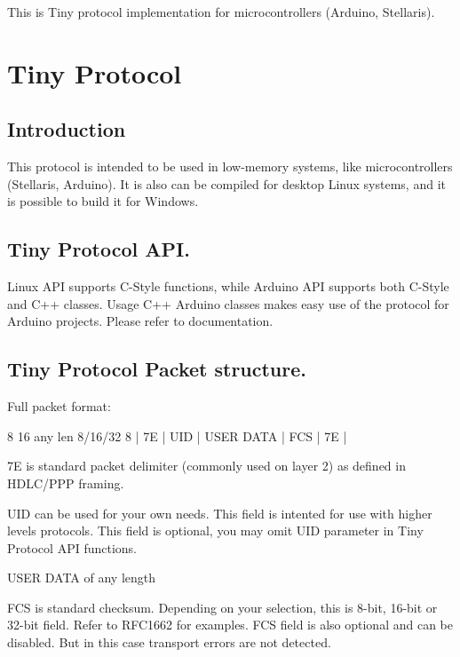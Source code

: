 This is Tiny protocol implementation for microcontrollers (Arduino, Stellaris).

\section*{Tiny Protocol}

\subsection*{Introduction}

This protocol is intended to be used in low-\/memory systems, like microcontrollers (Stellaris, Arduino). It is also can be compiled for desktop Linux systems, and it is possible to build it for Windows.

\subsection*{Tiny Protocol A\+P\+I.}

Linux A\+P\+I supports C-\/\+Style functions, while Arduino A\+P\+I supports both C-\/\+Style and C++ classes. Usage C++ Arduino classes makes easy use of the protocol for Arduino projects. Please refer to documentation.

\subsection*{Tiny Protocol Packet structure.}

Full packet format\+: 
\begin{DoxyPre}
   8    16     any len     8/16/32  8
 | 7E | UID |  USER DATA  |  FCS  | 7E |
\end{DoxyPre}



\begin{DoxyItemize}
\item 7\+E is standard packet delimiter (commonly used on layer 2) as defined in H\+D\+L\+C/\+P\+P\+P framing.
\item U\+I\+D can be used for your own needs. This field is intented for use with higher levels protocols. This field is optional, you may omit U\+I\+D parameter in Tiny Protocol A\+P\+I functions.
\item U\+S\+E\+R D\+A\+T\+A of any length
\item F\+C\+S is standard checksum. Depending on your selection, this is 8-\/bit, 16-\/bit or 32-\/bit field. Refer to R\+F\+C1662 for examples. F\+C\+S field is also optional and can be disabled. But in this case transport errors are not detected.
\end{DoxyItemize}

